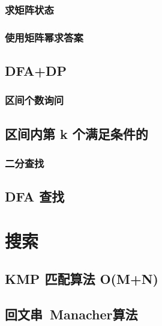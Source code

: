 \documentclass[a4paper]{article}
\begin{document}
\begin{CJK*}{UTF8}{gbsn}
\begin{multicols}{3}
\begin{flushleft}
\subsubsection{求矩阵状态}


\subsubsection{使用矩阵幂求答案}


\subsection{DFA+DP}

\subsubsection{区间个数询问}


\subsection{区间内第 k 个满足条件的}


\subsubsection{二分查找}


\subsection{DFA 查找}


\section{搜索}

\subsection{KMP 匹配算法 O(M+N)}


\subsection{回文串~Manacher算法}




\end{flushleft}
\end{multicols}
\end{CJK*}
\end{document}
